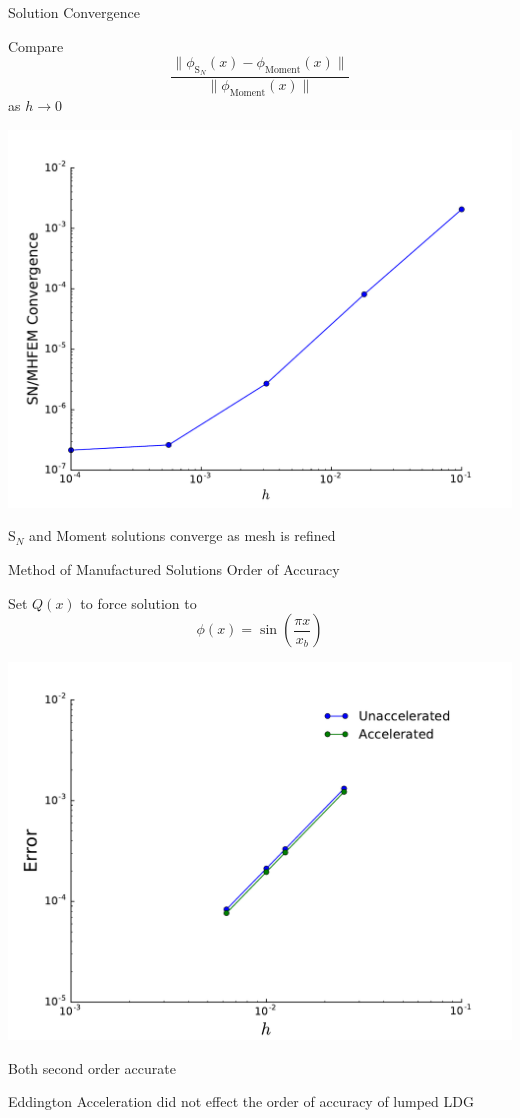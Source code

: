 \documentclass[10pt]{beamer}
\newcommand{\SN}{S$_N$\xspace}
\begin{document}
\begin{frame}{Solution Convergence}

	\onslide<+->
	Compare 
	\begin{equation*}
		\frac{\| \phi_{\text{S}_N}(x) - 
			\phi_\text{Moment}(x)\|}{\|\phi_\text{Moment}(x) \|}
	\end{equation*}
	as $h\rightarrow 0$ 

	\onslide<+->
	\centerline{\includegraphics[width=.5\paperwidth]{figs/hlim.pdf}}

	\onslide<+->
	\SN and Moment solutions converge as mesh is refined 

\end{frame}

\begin{frame}{Method of Manufactured Solutions Order of Accuracy} 

	Set $Q(x)$ to force solution to 
	\begin{equation*}
		\phi(x) = \sin\left(\frac{\pi x}{x_b}\right)
	\end{equation*}

	\pause
	\centerline{\includegraphics[width=.5\paperwidth]{figs/ooa.pdf}}

	\pause
	Both second order accurate

	\pause
	Eddington Acceleration did not effect the order of accuracy of lumped LDG 

\end{frame}
\end{document}
